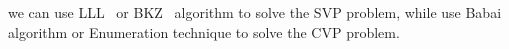 we can use LLL~\cite{Lenstra1982} or BKZ~\cite{Schnorr1994} algorithm to solve the SVP problem, while use Babai~\cite{Babai1986} algorithm or Enumeration technique to solve the CVP problem.


























